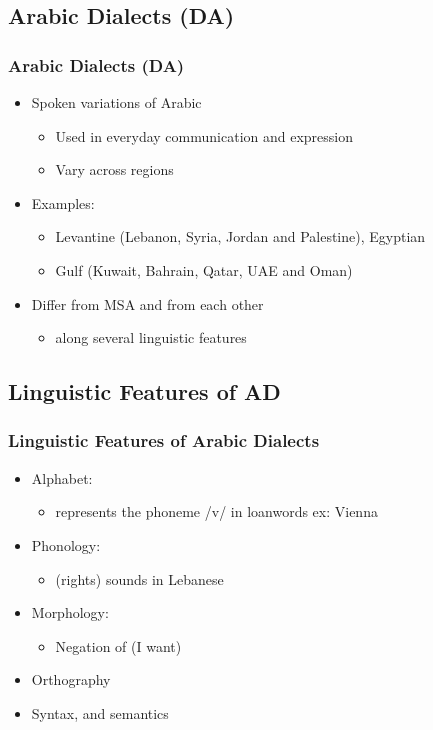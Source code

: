 \documentclass[xcolor=table]{beamer}
\newcommand{\bi}{\begin{itemize}}
\newcommand{\ei}{\end{itemize}}
\newcommand{\I}{\item}
\begin{document}
\subsection{Arabic Dialects (DA)}
\begin{frame}
\frametitle{Arabic Dialects (DA)}
\begin{itemize}
\item Spoken variations of Arabic 
\begin{itemize}
\item Used in everyday communication and expression
\item Vary across regions
\end{itemize}
\item Examples:
\begin{itemize}
\item Levantine (Lebanon, Syria, Jordan and Palestine), Egyptian
\item Gulf (Kuwait, Bahrain, Qatar, UAE and Oman)
\end{itemize}
\item Differ from {\color{red}MSA} and from {\color{red}each other}
\begin{itemize}
\item along several linguistic features
\end{itemize}
\end{itemize}

\end{frame}

\subsection*{Linguistic Features of AD}

\begin{frame}
\frametitle{Linguistic Features of Arabic Dialects}

\begin{itemize}[<+->]
\item Alphabet:
    \bi 
    \item {} represents the phoneme /v/ in loanwords ex:  Vienna
    \ei 
    \item Phonology: 
    \bi 
       \item {} (rights) sounds  in Lebanese
    \ei 
    \item Morphology: 
      \bi \I {} Negation of (I want)
      \ei 
    \item Orthography
    \item Syntax, and semantics
\end{itemize}
\end{frame}
\end{document}
